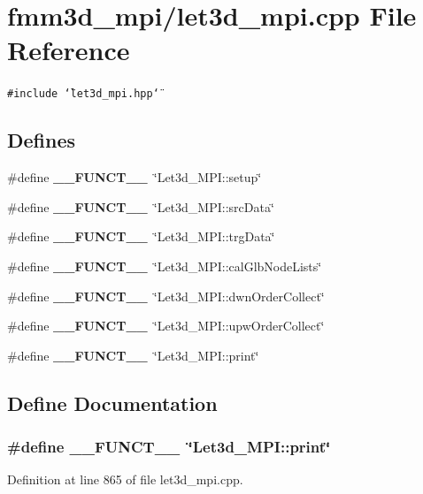 \section{fmm3d\_\-mpi/let3d\_\-mpi.cpp File Reference}
\label{let3d__mpi_8cpp}


{\tt \#include \char`\"{}let3d\_\-mpi.hpp\char`\"{}}\par
\subsection*{Defines}
\begin{CompactItemize}
\item 
\#define {\bf \_\-\_\-FUNCT\_\-\_\-}~\char`\"{}Let3d\_\-MPI::setup\char`\"{}
\item 
\#define {\bf \_\-\_\-FUNCT\_\-\_\-}~\char`\"{}Let3d\_\-MPI::src\-Data\char`\"{}
\item 
\#define {\bf \_\-\_\-FUNCT\_\-\_\-}~\char`\"{}Let3d\_\-MPI::trg\-Data\char`\"{}
\item 
\#define {\bf \_\-\_\-FUNCT\_\-\_\-}~\char`\"{}Let3d\_\-MPI::cal\-Glb\-Node\-Lists\char`\"{}
\item 
\#define {\bf \_\-\_\-FUNCT\_\-\_\-}~\char`\"{}Let3d\_\-MPI::dwn\-Order\-Collect\char`\"{}
\item 
\#define {\bf \_\-\_\-FUNCT\_\-\_\-}~\char`\"{}Let3d\_\-MPI::upw\-Order\-Collect\char`\"{}
\item 
\#define {\bf \_\-\_\-FUNCT\_\-\_\-}~\char`\"{}Let3d\_\-MPI::print\char`\"{}
\end{CompactItemize}


\subsection{Define Documentation}
\subsubsection{\setlength{\rightskip}{0pt plus 5cm}\#define \_\-\_\-FUNCT\_\-\_\-~\char`\"{}Let3d\_\-MPI::print\char`\"{}}\label{let3d__mpi_8cpp_2818853adf63a17949cf67d73c1d4473_2818853adf63a17949cf67d73c1d4473}




Definition at line 865 of file let3d\_\-mpi.cpp.
